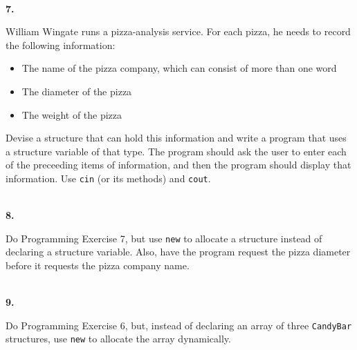 \documentclass[10 pt]{amsart}
\newlength{\cwidth}
\newenvironment{cpart}[2][\cwidth]
	{\\ \phantom{\qquad}\textbf{#2. }\begin{minipage}[t]{#1}}
	{\end{minipage}}
\begin{document}
	\begin{cpart}{7}
		William Wingate runs a pizza-analysis service. 
		For each pizza, he needs to record the following information:
		\begin{itemize}
			\item The name of the pizza company, which can consist of
				more than one word 
			\item The diameter of the pizza
			\item The weight of the pizza
		\end{itemize}
		Devise a structure that can hold this information and write a
		program that uses a structure variable of that type.
		The program should ask the user to enter each of the preceeding
		items of information, and then the program should display that
		information. 
		Use \texttt{cin} (or its methods) and \texttt{cout}.
	\end{cpart}
	\vspace{2ex}

	\begin{cpart}{8}
		Do Programming Exercise 7, but use \texttt{new} to allocate a 
		structure instead of declaring a structure variable.
		Also, have the program request the pizza diameter before
		it requests the pizza company name.
	\end{cpart}

	\begin{cpart}{9}
		Do Programming Exercise 6, but, instead of declaring an array
		of three \texttt{CandyBar} structures, use \texttt{new} to 
		allocate the array dynamically.
	\end{cpart}
\end{document}
